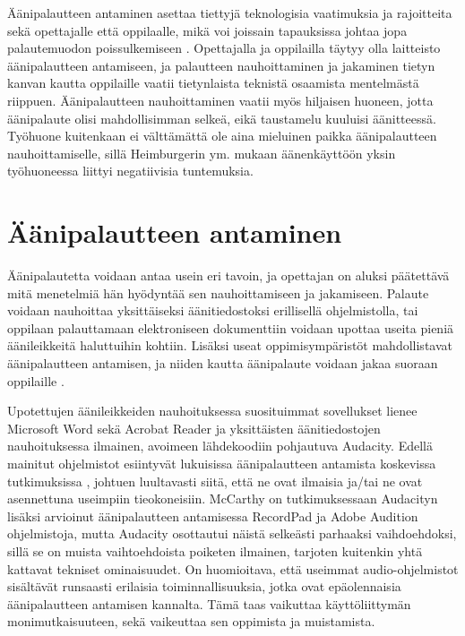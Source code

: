 \documentclass[utf8]{gradu3}
\begin{document}
Äänipalautteen antaminen asettaa tiettyjä teknologisia vaatimuksia ja rajoitteita sekä opettajalle että oppilaalle, mikä voi joissain tapauksissa johtaa jopa palautemuodon poissulkemiseen \parencite[][]{developing}. Opettajalla ja oppilailla täytyy olla laitteisto äänipalautteen antamiseen, ja palautteen nauhoittaminen ja jakaminen tietyn kanvan kautta oppilaille vaatii tietynlaista teknistä osaamista mentelmästä riippuen. Äänipalautteen nauhoittaminen vaatii myös hiljaisen huoneen, jotta äänipalaute olisi mahdollisimman selkeä, eikä taustamelu kuuluisi äänitteessä. Työhuone kuitenkaan ei välttämättä ole aina mieluinen paikka äänipalautteen nauhoittamiselle, sillä Heimburgerin ym. \parencite[][]{academics} mukaan äänenkäyttöön yksin työhuoneessa liittyi negatiivisia tuntemuksia.  

\section{Äänipalautteen antaminen}

Äänipalautetta voidaan antaa usein eri tavoin, ja opettajan on aluksi päätettävä mitä menetelmiä hän hyödyntää sen nauhoittamiseen ja jakamiseen. Palaute voidaan nauhoittaa yksittäiseksi äänitiedostoksi erillisellä ohjelmistolla, tai oppilaan palauttamaan elektroniseen dokumenttiin voidaan upottaa useita pieniä äänileikkeitä haluttuihin kohtiin. Lisäksi useat oppimisympäristöt mahdollistavat äänipalautteen antamisen, ja niiden kautta äänipalaute voidaan jakaa suoraan oppilaille \parencite[][]{using}. 

Upotettujen äänileikkeiden nauhoituksessa suosituimmat sovellukset lienee Microsoft Word sekä Acrobat Reader ja yksittäisten äänitiedostojen nauhoituksessa ilmainen, avoimeen lähdekoodiin pohjautuva Audacity. Edellä mainitut ohjelmistot esiintyvät lukuisissa äänipalautteen antamista koskevissa tutkimuksissa \parencite[][]{using, ice, principles, evaluating, areYouListening, engaging, academics, attitudes, versus}, johtuen luultavasti siitä, että ne ovat ilmaisia ja/tai ne ovat asennettuna useimpiin tieokoneisiin. McCarthy \parencite[][]{evaluating} on tutkimuksessaan Audacityn lisäksi arvioinut äänipalautteen antamisessa RecordPad ja Adobe Audition ohjelmistoja, mutta Audacity osottautui näistä selkeästi parhaaksi vaihdoehdoksi, sillä se on muista vaihtoehdoista poiketen ilmainen, tarjoten kuitenkin yhtä kattavat tekniset ominaisuudet. On huomioitava, että useimmat audio-ohjelmistot sisältävät runsaasti erilaisia toiminnallisuuksia, jotka ovat epäolennaisia äänipalautteen antamisen kannalta. Tämä taas vaikuttaa käyttöliittymän monimutkaisuuteen, sekä vaikeuttaa sen oppimista ja muistamista.
\end{document}
